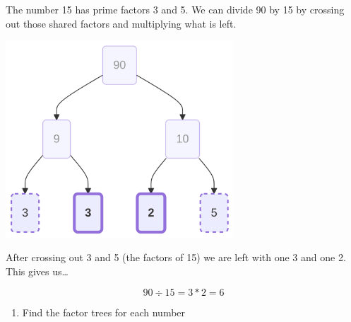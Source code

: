 \documentclass[
  letterpaper,
  DIV=11,
  numbers=noendperiod]{scrreprt}
\providecommand{\tightlist}{%
  \setlength{\itemsep}{0pt}\setlength{\parskip}{0pt}}
\begin{document}
The number 15 has prime factors 3 and 5. We can divide 90 by 15 by
crossing out those shared factors and multiplying what is left.

\includegraphics[width=3.35in,height=2.9in]{chapters/Unit_1/1.3_GCF_&_Simplifying_Fractions_files/figure-latex/mermaid-figure-12.png}

After crossing out 3 and 5 (the factors of 15) we are left with one 3
and one 2. This gives us\ldots{}

\[90 \div 15 = 3 * 2 = 6\]

\begin{enumerate}
\def\labelenumi{\arabic{enumi}.}
\tightlist
\item
  Find the factor trees for each number
\end{enumerate}
\end{document}

